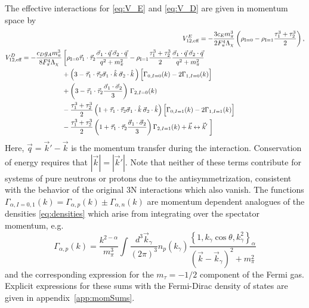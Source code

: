  The effective interactions for \eqref{eq:V_E} and \eqref{eq:V_D} are given in momentum space by
 \begin{align}
 \veff^E=-\frac{3c_Em_\pi^3}{2F_\pi^4 \Lambda_\chi}&\left(\rhozero-\rhoone\tauplusthree\right),\\
 \begin{split}
 \veff^D=-\frac{c_Dg_A m_\pi^3}{8 F_\pi^4\Lambda_\chi}&\left[\rhozero\taudot \frac{\vec{\sigma}_1\cdot\vec{q}\:\vec{\sigma}_2\cdot\vec{q} }{q^2+m_\pi^2}  - \rhoone \tauplusthree\frac{\vec{\sigma}_1\cdot\vec{q}\:\vec{\sigma}_2\cdot\vec{q} }{q^2+m_\pi^2} \right. \\
&+ \left(3 -\taudot\vec{\sigma}_1\cdot\hat{k}\:\vec{\sigma}_2\cdot\hat{k}\, \right) \Big[\Gamma_{0,I=0}(k)-2 \Gamma_{1,I=0}(k)\Big] \\
&+  \left(3 -\taudot\frac{\sigmadot}{3} \right) \,\Gamma_{2,I=0}(k) \\
 &-\tauplusthree \left(1 +\taudot\vec{\sigma}_1\cdot\hat{k}\:\vec{\sigma}_2\cdot\hat{k} \right) \Big[\Gamma_{0,I=1}(k)-2 \Gamma_{1,I=1}(k)\Big] \\
 &-\tauplusthree  \left(1+\taudot\frac{\sigmadot}{3} \right) \Gamma_{2,I=1}(k)
+ \vec{k}\leftrightarrow\vec{k}'\left.\fracphantom\right]
 \end{split} 
 \end{align}
Here, $\vec{q}=\vec{k}'-\vec{k}$ is the momentum transfer during the interaction. Conservation of energy requires that $|\vec{k}|=|\vec{k}'|$. Note that neither of these terms contribute for systems of pure neutrons or protons due to the antisymmetrization, consistent with the behavior of the original 3N interactions which also vanish. The functions $\Gamma_{\alpha,I=0,1}(k)=\Gamma_{\alpha,p}(k)\pm\Gamma_{\alpha,n}(k)$ are momentum dependent analogues of the densities \eqref{eq:densities} which arise from integrating over the spectator momentum, e.g. 
\begin{equation}
\Gamma_{\alpha,p}(k) = \frac{k^{2-\alpha}}{m_\pi^3}\int\frac{d^3\vec{k}_\gamma}{(2\pi)^3} n_{p}(k_\gamma) \frac{\left\{1,k_\gamma\cos\theta,k_\gamma^2\right\}_\alpha}{(\vec{k}-\vec{k}_\gamma)^2+m_\pi^2}
\end{equation}
and the corresponding expression for the $m_\tau=-1/2$ component of the Fermi gas. Explicit expressions for these sums with the Fermi-Dirac density of states are given in appendix~\ref{app:momSums}.

